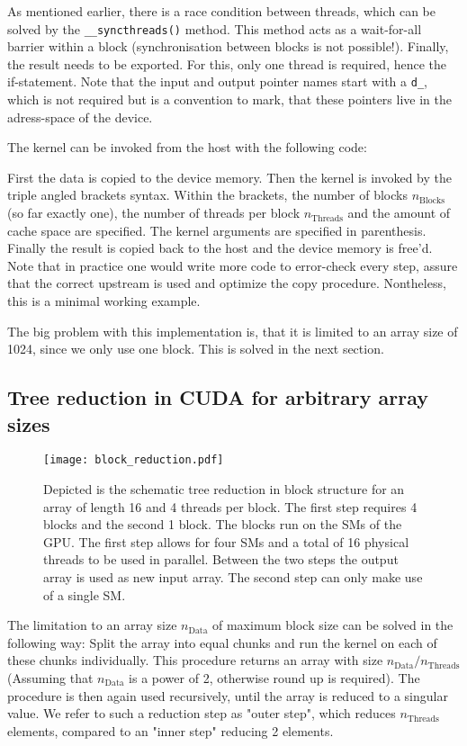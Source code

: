 

As mentioned earlier, there is a race condition between threads, which can be solved by the \texttt{\_\_syncthreads()} method.
This method acts as a wait-for-all barrier within a block (synchronisation between blocks is not possible!).
Finally, the result needs to be exported.
For this, only one thread is required, hence the if-statement.
Note that the input and output pointer names start with a \texttt{d\_}, which is not required but is a convention to mark, that these pointers live in the adress-space of the device.

The kernel can be invoked from the host with the following code:



First the data is copied to the device memory.
Then the kernel is invoked by the triple angled brackets syntax.
Within the brackets, the number of blocks \( n_\mathrm{Blocks} \) (so far exactly one), the number of threads per block \( n_{\mathrm{Threads}} \) and the amount of cache space are specified.
The kernel arguments are specified in parenthesis.
Finally the result is copied back to the host and the device memory is free'd.
Note that in practice one would write more code to error-check every step, assure that the correct upstream is used and optimize the copy procedure.
Nontheless, this is a minimal working example.

The big problem with this implementation is, that it is limited to an array size of 1024, since we only use one block.
This is solved in the next section.


\subsection{Tree reduction in CUDA for arbitrary array sizes}
\begin{figure}
    \centering
    \texttt{[image: block\_reduction.pdf]}
    \caption{
        Depicted is the schematic tree reduction in block structure for an array of length 16 and 4 threads per block.
        The first step requires 4 blocks and the second 1 block.
        The blocks run on the SMs of the GPU.
        The first step allows for four SMs and a total of 16 physical threads to be used in parallel.
        Between the two steps the output array is used as new input array.
        The second step can only make use of a single SM.
    }
\end{figure}
The limitation to an array size \( n_{\mathrm{Data}}\) of maximum block size can be solved in the following way:
Split the array into equal chunks and run the kernel on each of these chunks individually.
This procedure returns an array with size \( n_{\mathrm{Data}}/ n_{\mathrm{Threads}} \) (Assuming that \( n_{\mathrm{Data}} \) is a power of 2, otherwise round up is required).
The procedure is then again used recursively, until the array is reduced to a singular value.
We refer to such a reduction step as "outer step", which reduces \( n_{\mathrm{Threads}} \) elements, compared to an "inner step" reducing 2 elements.

